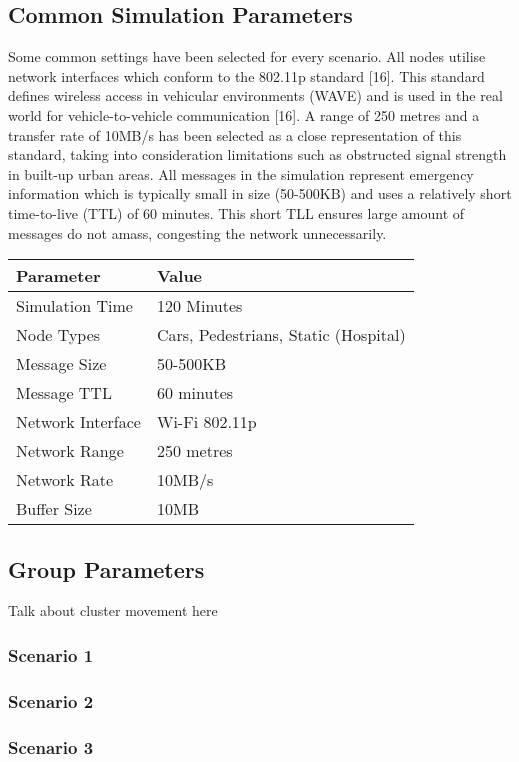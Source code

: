 \documentclass{article}
\begin{document}
\subsection{Common Simulation Parameters}
Some common settings have been selected for every scenario. All nodes utilise network interfaces which conform to the 802.11p standard [16]. This standard defines wireless access in vehicular environments (WAVE) and is used in the real world for vehicle-to-vehicle communication [16]. A range of 250 metres and a transfer rate of 10MB/s has been selected as a close representation of this standard, taking into consideration limitations such as obstructed signal strength in built-up urban areas. All messages in the simulation represent emergency information which is typically small in size (50-500KB) and uses a relatively short time-to-live (TTL) of 60 minutes. This short TLL ensures large amount of messages do not amass, congesting the network unnecessarily.\\
\begin{center}
\begin{tabular}{|l|l|}
\hline
\textbf{Parameter} & \textbf{Value} \\ \hline
Simulation Time & 120 Minutes \\ \hline
Node Types & Cars, Pedestrians, Static (Hospital) \\ \hline
Message Size & 50-500KB \\ \hline
Message TTL & 60 minutes \\ \hline
Network Interface & Wi-Fi 802.11p \\ \hline
Network Range & 250 metres \\ \hline
Network Rate & 10MB/s \\ \hline
Buffer Size & 10MB \\ \hline
\end{tabular}
\end{center}

\subsection{Group Parameters}
Talk about cluster movement here
\subsubsection{Scenario 1}
\subsubsection{Scenario 2}
\subsubsection{Scenario 3}
\end{document}
